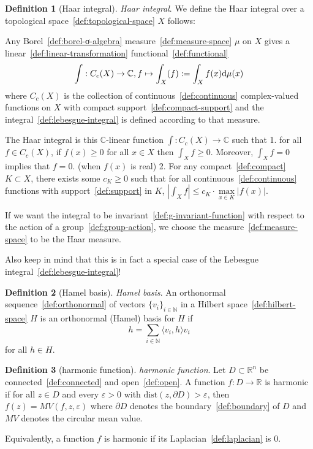 \documentclass[12pt,a4paper]{article}
\theoremstyle{definition}
\newtheorem{definition}{Definition}
\begin{document}
\begin{definition}[Haar integral]\label{def:haar-integral}
\emph{Haar integral}. We define the Haar integral over a topological space~\ref{def:topological-space} $X$ follows: 

Any Borel~\ref{def:borel-σ-algebra} measure~\ref{def:measure-space} $\mu$ on $X$ gives a linear~\ref{def:linear-transformation} functional~\ref{def:functional} $$\int:C_c(X) \to \mathbb C, f\mapsto \int_X(f) := \int_X f(x)\text d\mu(x)$$ where $C_c(X)$ is the collection of continuous~\ref{def:continuous} complex-valued functions on $X$ with compact support~\ref{def:compact-support} and the integral~\ref{def:lebesgue-integral} is defined according to that measure.

The Haar integral is this $\mathbb C$-linear function $\int:C_c(X) \to \mathbb C$  such that
1. for all $f\in C_c(X)$, if $f(x) \geq 0$ for all $x\in X$ then $\int_X f \geq 0$. Moreover, $\int_X f= 0$ implies that $f=0$.  (when $f(x)$ is real)
2. For any compact~\ref{def:compact} $K\subset X$, there exists some $c_K\geq 0$ such that for all continuous~\ref{def:continuous} functions with support~\ref{def:support} in $K$, $\left\vert \int_X f\right\vert  \leq c_K\cdot \max\limits_{x\in K} \vert f(x)\vert $.

If we want the integral to be invariant~\ref{def:g-invariant-function} with respect to the action of a group~\ref{def:group-action}, we choose the measure~\ref{def:measure-space} to be the Haar measure.

Also keep in mind that this is in fact a special case of the Lebesgue integral~\ref{def:lebesgue-integral}!
\end{definition}

\begin{definition}[Hamel basis]\label{def:hamel-basis}
\emph{Hamel basis}. An orthonormal sequence~\ref{def:orthonormal} of vectors $\{v_i\}_{i\in\mathbb N}$ in a Hilbert space~\ref{def:hilbert-space} $H$ is an orthonormal (Hamel) basis for $H$ if $$h = \sum_{i\in\mathbb N} \langle v_i, h\rangle v_i$$ for all $h \in H$.
\end{definition}

\begin{definition}[harmonic function]\label{def:harmonic-function}
\emph{harmonic function}. Let $D\subset\mathbb R^n$ be connected~\ref{def:connected} and open~\ref{def:open}. A function $f:D\to \mathbb R$ is harmonic if for all $z\in D$ and every $\varepsilon > 0$ with $\text{dist}(z,\partial D) > \varepsilon$, then $f(z) = MV(f,z,\varepsilon)$ where $\partial D$ denotes the boundary~\ref{def:boundary} of $D$ and $MV$ denotes the circular mean value. 

Equivalently, a function $f$ is harmonic if its Laplacian~\ref{def:laplacian} is 0.
\end{definition}
\end{document}
